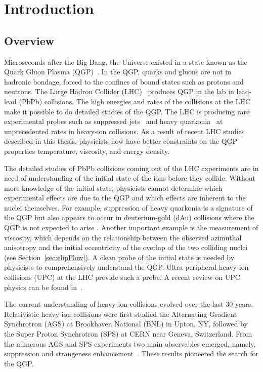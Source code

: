 \chapter{Introduction}
  \section{Overview}
  Microseconds after the Big Bang, the Universe existed in a state known as
    the Quark Gluon Plasma (QGP)~\cite{Witten:1984rs,Vogt:1998kna}.
  In the QGP, quarks and gluons are not in hadronic bondage, forced to 
    the confines of bound states such as protons and neutrons.
  The Large Hadron Collider (LHC)~\cite{Evans:2008zzb} produces QGP in the lab in lead-lead (PbPb)
    collisions.
  The high energies and rates of the collisions at the LHC make it possible 
    to do detailed studies of the QGP. 
  The LHC is producing rare experimental probes such as suppressed jets~\cite{Gyulassy:1990ye} and 
    heavy quarkonia~\cite{Matsui:1986dk} at unprecedented rates in heavy-ion collisions. 
  As a result of recent LHC studies described in this thesis, physicists now 
    have better constraints on the QGP properties \DIFdelbegin {}\DIFdelend \DIFaddbegin {}\DIFaddend temperature, viscosity, 
    and energy density.

  The detailed studies of PbPb collisions coming out of the LHC 
    experiments are in need of \DIFdelbegin {}\DIFdelend \DIFaddbegin {}\DIFaddend understanding of the initial state of the ions 
    before they collide.
  Without more knowledge of the initial state, physicists cannot determine 
    which experimental effects are due to the QGP and which effects are 
    inherent to the nuclei themselves. 
  For example, suppression of heavy quarkonia is a signature of the QGP 
    but also appears to occur in deuterium-gold (dAu) collisions where the QGP 
    is not expected to arise \cite{dAuOniaPHENIX}. 
  Another important example is the measurement of viscosity, which depends on 
    the relationship between the observed azimuthal anisotropy and the 
    initial eccentricity of the overlap of the two colliding nuclei 
    (see Section~\ref{sec:elipFlow}). 
  A clean probe of the initial state is needed by physicists to comprehensively 
    understand the QGP.
  Ultra-peripheral heavy-ion collisions (UPC) at the LHC provide such a probe. 
  A recent review on UPC physics can be found in~\cite{Baltz:2007kq,Bertulani:2005ru}.

  The current understanding of heavy-ion collisions evolved over the
    last 30 years.
  Relativistic heavy-ion collisions were first studied \DIFdelbegin {}\DIFdelend \DIFaddbegin {}\DIFaddend the 
    Alternating Gradient Synchrotron (AGS) at Brookhaven National \DIFdelbegin {}\DIFdelend \DIFaddbegin {}\DIFaddend (BNL) 
    in Upton, NY, followed by the Super Proton Synchrotron (SPS) at CERN near 
    Geneva, Switzerland. 
  From the numerous AGS and SPS experiments two main observables emerged,
    namely, \JPsi{} suppression and strangeness enhancement~\cite{Margetis:2000sv}. 
  These results pioneered the search for the QGP. 

